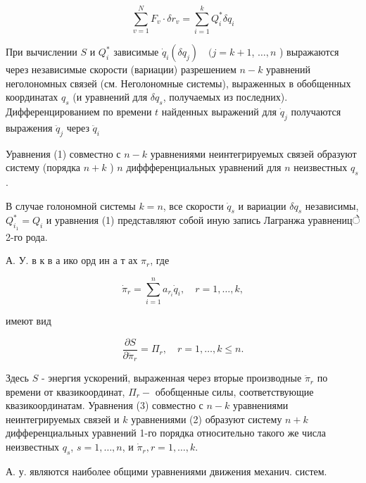 \documentclass[10pt]{article}
\begin{document}
\[

\sum_{v=1}^{N} F_{v} \cdot \delta r_{v}=\sum_{i=1}^{k} Q_{i}^{*} \delta q_{i}

\]



При вычислении $S$ и $Q_{i}^{*}$ зависимые $\dot{q}_{i}\left(\delta q_{j}\right) \quad(j=k+1$, $\ldots, n$ ) выражаются через независимые скорости (вариации) разрешением $n-k$ уравнений неголономных связей (см. Неголономные системы), выраженных в обобщенных координатах $q_{s}$ (и уравнений для $\delta q_{s}$, получаемых из последних). Дифференцированием по времени $t$ найденных выражений для $\dot{q}_{j}$ получаются выражения $\ddot{q}_{j}$ через $\ddot{q}_{i}$



Уравнения (1) совместно с $n-k$ уравнениями неинтегрируемых связей образуют систему (порядка $n+k$ ) $n$ диффференциальных уравнений для $n$ неизвестных $q_{s}$.



В случае голономной системы $k=n$, все скорости $\dot{q}_{s}$ и вариации $\delta q_{s}$ независимы, $Q_{i_{1}}^{*}=Q_{i}$ и уравнения (1) представляют собой иную запись Лагранжа уравненицे 2-го рода.



А. У. в к в а ико орд ин а т ах $\pi_{r}$, где



\[

\dot{\pi}_{r}=\sum_{i=1}^{n} a_{r_{i}} \dot{q}_{i}, \quad r=1, \ldots, k,

\]



имеют вид



\[

\frac{\partial S}{\partial \ddot{\pi}_{r}}=\Pi_{r}, \quad r=1, \ldots, k \leqslant n .

\]



Здесь $S$ - энергия ускорений, выраженная через вторые производные $\ddot{\pi}_{r}$ по времени от квазикоординат, $\Pi_{r}-$ обобщенные силы, соответствующие квазикоординатам. Уравнения (3) совместно с $n-k$ уравнениями неинтегрируемых связей и $k$ уравнениями (2) образуют систему $n+k$ дифференциальных уравнений 1-го порядка относительно такого же числа неизвестных $q_{s}$, $s=1, \ldots, n$, и $\dot{\pi}_{r}, r=1, \ldots, k$.



А. у. являются наиболее общими уравнениями движения механич. систем.
\end{document}
